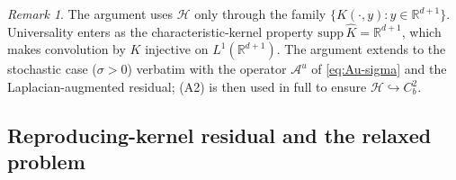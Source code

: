 \documentclass[11pt,leqno]{article}
\theoremstyle{plain}
\theoremstyle{remark}
\newtheorem*{rem}{Remark}
\theoremstyle{definition}
\numberwithin{equation}{section}
\numberwithin{figure}{section}
\numberwithin{table}{section}
\begin{document}
\begin{rem}
The argument uses $\mathcal{H}$ only through the family
$\{K(\cdot,y):y\in\mathbb{R}^{d+1}\}$.  Universality enters as the
characteristic-kernel property
$\mathrm{supp}\,\widehat{K}=\mathbb{R}^{d+1}$, which makes
convolution by $K$ injective on $L^1(\mathbb{R}^{d+1})$.  The argument extends to the
stochastic case ($\sigma>0$) verbatim with the operator
$\mathcal{A}^u$ of \eqref{eq:Au-sigma} and the Laplacian-augmented
residual; (A2) is then used in full to ensure
$\mathcal{H}\hookrightarrow C_b^2$.
\end{rem}

\subsection{Reproducing-kernel residual and the relaxed problem}
\label{sec:3-residual}
\end{document}
